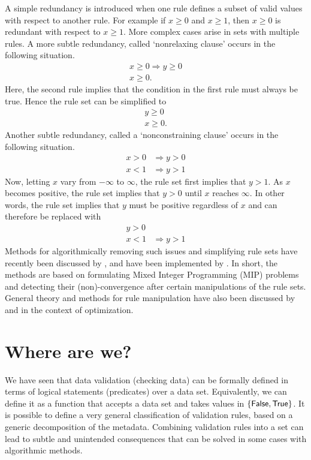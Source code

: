 A simple redundancy is introduced when one rule defines a subset of valid
values with respect to another rule. For example if $x \geq 0$ and $x\geq 1$,
then $x\geq 0$ is redundant with respect to $x\geq 1$. More complex cases arise
in sets with multiple rules. A more subtle redundancy, called `nonrelaxing clause'
occurs in the following situation.
\begin{align*}
x \geq 0 \Rightarrow y \geq 0\\
x \geq 0.
\end{align*}
Here, the second rule implies that the condition in the first rule must always
be true. Hence the rule set can be simplified to 
\begin{align*}
y \geq 0\\
x \geq 0.
\end{align*}
Another subtle redundancy, called a `nonconstraining clause' occurs in
the following situation.
\begin{align*}
x > 0 &\Rightarrow y > 0\\
x < 1 &\Rightarrow y > 1
\end{align*}
Now, letting $x$ vary from $-\infty$ to $\infty$, the rule set first implies
that $y>1$. As $x$ becomes positive, the rule set implies that $y>0$ until $x$
reaches $\infty$. In other words, the rule set implies that $y$ must be
positive regardless of $x$ and can therefore be replaced with
\begin{align*}
y > 0\\
x < 1 &\Rightarrow y > 1
\end{align*}
Methods for algorithmically removing such issues and simplifying rule sets have
recently been discussed by \cite{daalmans2018constraint}, and have been
implemented by \citet{jonge2019validatetools}. In short, the methods are based
on formulating Mixed Integer Programming (MIP) problems and detecting their
(non)-convergence after certain manipulations of the rule sets. General theory
and methods for rule manipulation have also been discussed by
\citet{chandru1999optimization}  and \citet{hooker2000logic} in the context of
optimization.

\section*{Where are we?}
We have seen that data validation (checking data) can be formally defined in
terms of logical statements (predicates) over a data set. Equivalently, we can
define it as a function that accepts a data set and takes values in
$\{\textsf{False},\textsf{True}\}$. It is possible to define a very general classification of
validation rules, based on a generic decomposition of the metadata. Combining
validation rules into a set can lead to subtle and unintended consequences that
can be solved in some cases with algorithmic methods.

